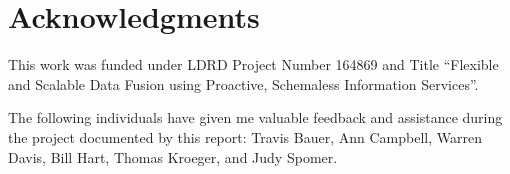 \documentclass[pdf,12pt,report,strict]{SANDreport}
\begin{document}
    \clearpage
    \chapter*{Acknowledgments}
This work was funded under LDRD Project Number 164869 and Title ``Flexible and Scalable Data Fusion using
Proactive, Schemaless Information Services''.

The following individuals have given me valuable feedback and assistance during the project documented by
this report: Travis Bauer, Ann Campbell, Warren Davis, Bill Hart, Thomas Kroeger, and Judy Spomer.

    \cleardoublepage		%
    \tableofcontents
    \listoffigures
    \listoftables

\begin{comment}
    \clearpage
    \chapter*{Preface}
    \addcontentsline{toc}{chapter}{Preface}


    \clearpage
    \chapter*{Summary}
    \addcontentsline{toc}{chapter}{Summary}


    \clearpage
    \chapter*{Nomenclature}
    \addcontentsline{toc}{chapter}{Nomenclature}
    \begin{description}
	\item[Term 1]
	    Description
	\item[Term 2]
	    Description
	\item[Term 3]
	    Description
    \end{description}
\end{comment}
\end{document}

